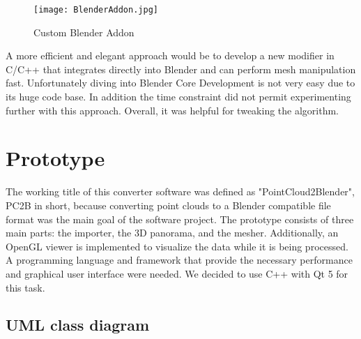 \begin{figure}[h]
	\centering
	\texttt{[image: BlenderAddon.jpg]}
	\caption{Custom Blender Addon}
	\label{fig:blender_addon}
\end{figure}

A more efficient and elegant approach would be to develop a new modifier in C/C++ that integrates directly into Blender and can perform mesh manipulation fast. Unfortunately diving into Blender Core Development is not very easy due to its huge code base. In addition the time constraint did not permit experimenting further with this approach. Overall, it was helpful for tweaking the algorithm.

\section{Prototype}

The working title of this converter software was defined as "PointCloud2Blender", PC2B in short, because converting point clouds to a Blender compatible file format was the main goal of the software project. The prototype consists of three main parts: the importer, the 3D panorama, and the mesher. Additionally, an OpenGL viewer is implemented to visualize the data while it is being processed. A programming language and framework that provide the necessary performance and graphical user interface were needed. We decided to use C++ with Qt 5 for this task.

\subsection{UML class diagram}

